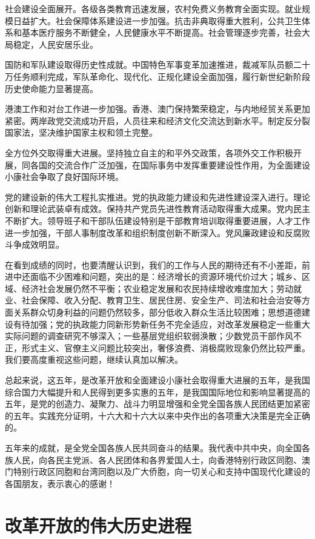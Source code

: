 社会建设全面展开。各级各类教育迅速发展，农村免费义务教育全面实现。就业规模日益扩大。社会保障体系建设进一步加强。抗击非典取得重大胜利，公共卫生体系和基本医疗服务不断健全，人民健康水平不断提高。社会管理逐步完善，社会大局稳定，人民安居乐业。

国防和军队建设取得历史性成就。中国特色军事变革加速推进，裁减军队员额二十万任务顺利完成，军队革命化、现代化、正规化建设全面加强，履行新世纪新阶段历史使命能力显著提高。

港澳工作和对台工作进一步加强。香港、澳门保持繁荣稳定，与内地经贸关系更加紧密。两岸政党交流成功开启，人员往来和经济文化交流达到新水平。制定反分裂国家法，坚决维护国家主权和领土完整。

全方位外交取得重大进展。坚持独立自主的和平外交政策，各项外交工作积极开展，同各国的交流合作广泛加强，在国际事务中发挥重要建设性作用，为全面建设小康社会争取了良好国际环境。

党的建设新的伟大工程扎实推进。党的执政能力建设和先进性建设深入进行。理论创新和理论武装卓有成效。保持共产党员先进性教育活动取得重大成果。党内民主不断扩大。领导班子和干部队伍建设特别是干部教育培训取得重要进展，人才工作进一步加强，干部人事制度改革和组织制度创新不断深入。党风廉政建设和反腐败斗争成效明显。

在看到成绩的同时，也要清醒认识到，我们的工作与人民的期待还有不小差距，前进中还面临不少困难和问题，突出的是：经济增长的资源环境代价过大；城乡、区域、经济社会发展仍然不平衡；农业稳定发展和农民持续增收难度加大；劳动就业、社会保障、收入分配、教育卫生、居民住房、安全生产、司法和社会治安等方面关系群众切身利益的问题仍然较多，部分低收入群众生活比较困难；思想道德建设有待加强；党的执政能力同新形势新任务不完全适应，对改革发展稳定一些重大实际问题的调查研究不够深入；一些基层党组织软弱涣散；少数党员干部作风不正，形式主义、官僚主义问题比较突出，奢侈浪费、消极腐败现象仍然比较严重。我们要高度重视这些问题，继续认真加以解决。

总起来说，这五年，是改革开放和全面建设小康社会取得重大进展的五年，是我国综合国力大幅提升和人民得到更多实惠的五年，是我国国际地位和影响显著提高的五年，是党的创造力、凝聚力、战斗力明显增强和全党全国各族人民团结更加紧密的五年。实践充分证明，十六大和十六大以来中央作出的各项重大决策是完全正确的。

五年来的成就，是全党全国各族人民共同奋斗的结果。我代表中共中央，向全国各族人民，向各民主党派、各人民团体和各界爱国人士，向香港特别行政区同胞、澳门特别行政区同胞和台湾同胞以及广大侨胞，向一切关心和支持中国现代化建设的各国朋友，表示衷心的感谢！

\section{改革开放的伟大历史进程}


